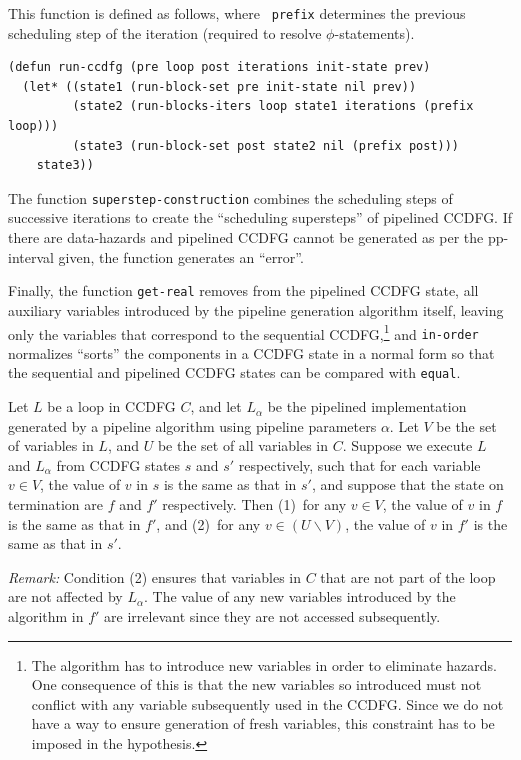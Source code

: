   This function is defined as follows, where {\tt
  prefix} determines the previous scheduling step of the
iteration (required to resolve $\phi$-statements).

\begin{verbatim}
(defun run-ccdfg (pre loop post iterations init-state prev)
  (let* ((state1 (run-block-set pre init-state nil prev))
         (state2 (run-blocks-iters loop state1 iterations (prefix loop)))
         (state3 (run-block-set post state2 nil (prefix post)))
    state3))
\end{verbatim}

The
function {\tt superstep-construction} combines the
scheduling steps of successive iterations to create the
``scheduling supersteps'' of pipelined CCDFG.  If there are
data-hazards and pipelined CCDFG cannot be generated as per
the pp-interval given, the function generates an ``error''.



Finally, the function {\tt get-real} removes from the
pipelined CCDFG state, all auxiliary variables introduced by
the pipeline generation algorithm itself, leaving only the
variables that correspond to the sequential
CCDFG,\footnote{The algorithm has to introduce new variables
  in order to eliminate hazards.  One consequence of this is
  that the new variables so introduced must not conflict
  with any variable subsequently used in the CCDFG.  Since
  we do not have a way to ensure generation of fresh
  variables, this constraint has to be imposed in the
  hypothesis.}  and {\tt in-order} normalizes ``sorts'' the
components in a CCDFG state in a normal form so that the
sequential and pipelined CCDFG states can be compared with
{\tt equal}.


 \smallskip
{}
Let $L$ be a loop in CCDFG $C$, and let $L_{\alpha}$ be the
pipelined implementation generated by a pipeline algorithm using
pipeline parameters $\alpha$.  Let $V$ be the set of
variables in $L$, and $U$ be the set of all
variables in $C$.  Suppose we execute $L$ and $L_{\alpha}$
from CCDFG states $s$ and $s'$ respectively, such that for
each variable $v\in V$, the value of $v$ in $s$ is the same
as that in $s'$, and suppose that the state on termination
are $f$ and $f'$ respectively.  Then (1)~for any $v\in V$,
the value of $v$ in $f$ is the same as that in $f'$, and
(2)~for any $v\in(U\backslash V)$, the value of $v$ in $f'$
is the same as that in $s'$.

\medskip
\noindent
{\em Remark:} Condition (2)
ensures that variables in $C$ that are not part of the loop
are not affected by $L_{\alpha}$.  The value of any new
variables introduced by the algorithm in $f'$ are irrelevant since they are not accessed
subsequently.




